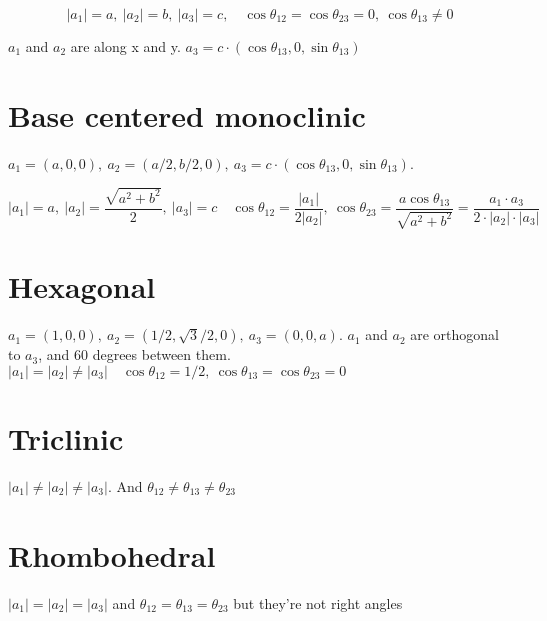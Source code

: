 \documentclass[a4paper,10pt]{article} 	%
\numberwithin{equation}{section}
\begin{document}
	\begin{equation}\label{key}
		|a_1| = a,\ |a_2| = b,\ |a_3| = c, \quad \cos \theta_{12} = \cos \theta_{23} = 0, \ \cos \theta_{13} \neq 0
	\end{equation}
	
	$a_1$ and $a_2$ are along x and y. $a_3 = c \cdot (\cos \theta_{13},0,\sin \theta_{13})$
	
	\section{Base centered monoclinic}
	$ a_1 = (a,0,0),\ a_2 =(a/2, b/2,0),\ a_3 = c \cdot (\cos \theta_{13},0,\sin \theta_{13}) $.
	
	\begin{equation}\label{key}
	|a_1| = a,\ |a_2| = \frac{\sqrt{a^2+b^2}}{2}, \ |a_3| = c \quad \cos \theta_{12} = \frac{|a_1|}{2|a_2|}, \ \cos \theta_{23} = \frac{a\cos\theta_{13}}{\sqrt{a^2+b^2}} = \frac{a_1 \cdot a_3}{2 \cdot |a_2| \cdot |a_3|}
	\end{equation}
	
	
	\section{Hexagonal}
	$ a_1 = (1,0,0),\ a_2 = (1/2,\sqrt{3}/2,0),\ a_3 = (0,0,a) $. $a_1$ and $a_2$ are orthogonal to $a_3$, and 60 degrees between them.
	$|a_1| = |a_2| \neq |a_3| \quad \cos \theta_{12} = 1/2, \ \cos \theta_{13} = \cos \theta_{23} = 0$
	
	\section{Triclinic}
	$|a_1| \neq |a_2| \neq |a_3|$. And $\theta_{12} \neq \theta_{13} \neq \theta_{23}$
	
	\section{Rhombohedral}
	$|a_1| = |a_2| = |a_3|$ and $\theta_{12} = \theta_{13} = \theta_{23}$ but they're not right angles
\end{document}

